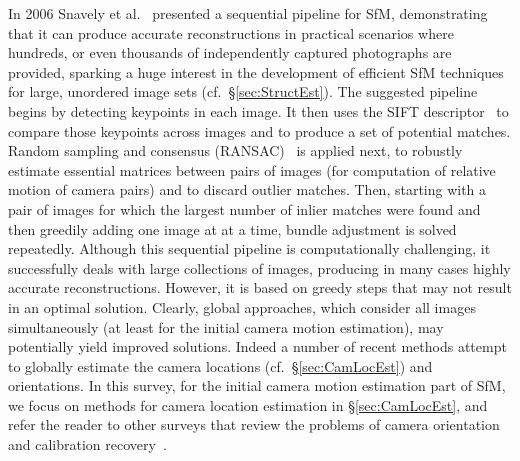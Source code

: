 \documentclass[10pt]{article}
\begin{document}
In 2006 Snavely et al.~\cite{SnavelyData} presented a sequential pipeline for SfM, demonstrating that it can produce accurate reconstructions in practical scenarios where hundreds, or even thousands of independently captured photographs are provided, sparking a huge interest in the development of efficient SfM techniques for large, unordered image sets (cf.~\S\ref{sec:StructEst}). The suggested pipeline begins by detecting keypoints in each image. It then uses the SIFT descriptor~\cite{SIFT} to compare those keypoints across images and to produce a set of potential matches. Random sampling and consensus (RANSAC)~\cite{ransac} is applied next, to robustly estimate essential matrices between pairs of images (for computation of relative motion of camera pairs) and to discard outlier matches. Then, starting with a pair of images for which the largest number of inlier matches were found and then greedily adding one image at at a time, bundle adjustment is solved repeatedly. Although this sequential pipeline is computationally challenging, it successfully deals with large collections of images, producing in many cases highly accurate reconstructions. However, it is based on greedy steps that may not result in an optimal solution. Clearly, global approaches, which consider all images simultaneously (at least for the initial camera motion estimation), may potentially yield improved solutions. Indeed a number of recent methods attempt to globally estimate the camera locations (cf.~\S\ref{sec:CamLocEst}) and orientations. In this survey, for the initial camera motion estimation part of SfM, we focus on methods for camera location estimation in \S\ref{sec:CamLocEst}, and refer the reader to other surveys that review the problems of camera orientation and calibration recovery~\cite{TronSurvey}.
\end{document}
